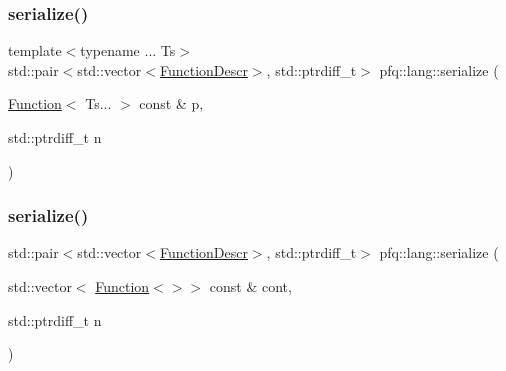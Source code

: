 \subsubsection{\texorpdfstring{serialize()}{serialize()}\hspace{0.1cm}{\footnotesize\ttfamily [4/6]}}
{\footnotesize\ttfamily template$<$typename ... Ts$>$ \\
std\+::pair$<$std\+::vector$<$\hyperlink{structpfq_1_1lang_1_1FunctionDescr}{Function\+Descr}$>$, std\+::ptrdiff\+\_\+t$>$ pfq\+::lang\+::serialize (\begin{DoxyParamCaption}\item[{\hyperlink{structpfq_1_1lang_1_1Function}{Function}$<$ Ts... $>$ const \&}]{p,  }\item[{std\+::ptrdiff\+\_\+t}]{n }\end{DoxyParamCaption})\hspace{0.3cm}{\ttfamily [inline]}}

\mbox{\label{namespacepfq_1_1lang_aa88658cb028dffc2e03a0fe2e8304bec}} 
\subsubsection{\texorpdfstring{serialize()}{serialize()}\hspace{0.1cm}{\footnotesize\ttfamily [5/6]}}
{\footnotesize\ttfamily std\+::pair$<$std\+::vector$<$\hyperlink{structpfq_1_1lang_1_1FunctionDescr}{Function\+Descr}$>$, std\+::ptrdiff\+\_\+t$>$ pfq\+::lang\+::serialize (\begin{DoxyParamCaption}\item[{std\+::vector$<$ \hyperlink{structpfq_1_1lang_1_1Function}{Function}$<$$>$$>$ const \&}]{cont,  }\item[{std\+::ptrdiff\+\_\+t}]{n }\end{DoxyParamCaption})\hspace{0.3cm}{\ttfamily [inline]}}

\mbox{\label{namespacepfq_1_1lang_ac064e0b32cebb9c8f7073ba87a840d42}} 
